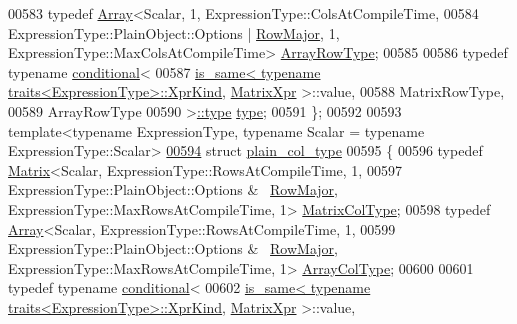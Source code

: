 \begin{DoxyCode}
{00583   \textcolor{keyword}{typedef} \hyperlink{group___core___module_class_eigen_1_1_array}{Array}<Scalar, 1, ExpressionType::ColsAtCompileTime,
00584                  ExpressionType::PlainObject::Options | \hyperlink{group__enums_ggaacded1a18ae58b0f554751f6cdf9eb13acfcde9cd8677c5f7caf6bd603666aae3}{RowMajor}, 1, 
      ExpressionType::MaxColsAtCompileTime> \hyperlink{group___core___module_class_eigen_1_1_array}{ArrayRowType};
00585 
00586   \textcolor{keyword}{typedef} \textcolor{keyword}{typename} \hyperlink{struct_eigen_1_1internal_1_1conditional}{conditional}<
00587     \hyperlink{struct_eigen_1_1internal_1_1is__same}{is\_same< typename traits<ExpressionType>::XprKind}, 
      \hyperlink{struct_eigen_1_1_matrix_xpr}{MatrixXpr} >::value,
00588     MatrixRowType,
00589     ArrayRowType 
00590   >\hyperlink{class_eigen_1_1internal_1_1_tensor_lazy_evaluator_writable}{::type} \hyperlink{class_eigen_1_1internal_1_1_tensor_lazy_evaluator_writable}{type};
00591 \};
00592 
00593 \textcolor{keyword}{template}<\textcolor{keyword}{typename} ExpressionType, \textcolor{keyword}{typename} Scalar = \textcolor{keyword}{typename} ExpressionType::Scalar>
\hyperlink{struct_eigen_1_1internal_1_1plain__col__type}{00594} \textcolor{keyword}{struct }\hyperlink{struct_eigen_1_1internal_1_1plain__col__type}{plain\_col\_type}
00595 \{
00596   \textcolor{keyword}{typedef} \hyperlink{group___core___module_class_eigen_1_1_matrix}{Matrix}<Scalar, ExpressionType::RowsAtCompileTime, 1,
00597                  ExpressionType::PlainObject::Options & ~\hyperlink{group__enums_ggaacded1a18ae58b0f554751f6cdf9eb13acfcde9cd8677c5f7caf6bd603666aae3}{RowMajor}, 
      ExpressionType::MaxRowsAtCompileTime, 1> \hyperlink{group___core___module_class_eigen_1_1_matrix}{MatrixColType};
00598   \textcolor{keyword}{typedef} \hyperlink{group___core___module_class_eigen_1_1_array}{Array}<Scalar, ExpressionType::RowsAtCompileTime, 1,
00599                  ExpressionType::PlainObject::Options & ~\hyperlink{group__enums_ggaacded1a18ae58b0f554751f6cdf9eb13acfcde9cd8677c5f7caf6bd603666aae3}{RowMajor}, 
      ExpressionType::MaxRowsAtCompileTime, 1> \hyperlink{group___core___module_class_eigen_1_1_array}{ArrayColType};
00600 
00601   \textcolor{keyword}{typedef} \textcolor{keyword}{typename} \hyperlink{struct_eigen_1_1internal_1_1conditional}{conditional}<
00602     \hyperlink{struct_eigen_1_1internal_1_1is__same}{is\_same< typename traits<ExpressionType>::XprKind}, 
      \hyperlink{struct_eigen_1_1_matrix_xpr}{MatrixXpr} >::value,
}
\end{DoxyCode}
